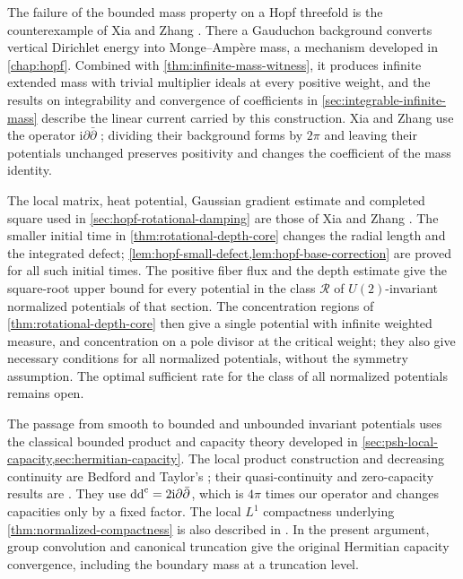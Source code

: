 The failure of the bounded mass property on a Hopf threefold is the counterexample of Xia and Zhang \cite[v1, Theorem~1.1, p.~2]{XZ26}. There a Gauduchon background converts vertical Dirichlet energy into Monge--Amp\`ere mass, a mechanism developed in \cref{chap:hopf}. Combined with \cref{thm:infinite-mass-witness}, it produces infinite extended mass with trivial multiplier ideals at every positive weight, and the results on integrability and convergence of coefficients in \cref{sec:integrable-infinite-mass} describe the linear current carried by this construction. Xia and Zhang use the operator $\mathrm i\partial\bar\partial$ \cite[v1, Section~1, p.~2]{XZ26}; dividing their background forms by $2\pi$ and leaving their potentials unchanged preserves positivity and changes the coefficient of the mass identity.

\label{hist:hopf-rotational-damping}
The local matrix, heat potential, Gaussian gradient estimate and completed square used in \cref{sec:hopf-rotational-damping} are those of Xia and Zhang \cite[v1, Lemma~2.2, pp.~4--5; Lemmas~3.1--3.3, pp.~6--9; equation~(4.2), p.~10]{XZ26}. The smaller initial time in \cref{thm:rotational-depth-core} changes the radial length and the integrated defect; \cref{lem:hopf-small-defect,lem:hopf-base-correction} are proved for all such initial times. The positive fiber flux and the depth estimate give the square-root upper bound for every potential in the class $\mathcal R$ of $U(2)$-invariant normalized potentials of that section. The concentration regions of \cref{thm:rotational-depth-core} then give a single potential with infinite weighted measure, and concentration on a pole divisor at the critical weight; they also give necessary conditions for all normalized potentials, without the symmetry assumption. The optimal sufficient rate for the class of all normalized potentials remains open.

The passage from smooth to bounded and unbounded invariant potentials uses the classical bounded product and capacity theory developed in \cref{sec:psh-local-capacity,sec:hermitian-capacity}. The local product construction and decreasing continuity are Bedford and Taylor's \cite[Theorem~2.1, pp.~4--7; Theorem~2.4, pp.~7--9; Corollary~2.8, p.~10]{BT82}; their quasi-continuity and zero-capacity results are \cite[Theorem~3.5, pp.~13--14; Theorems~6.9--6.10, pp.~25--26]{BT82}. They use $\mathrm{dd}^{\mathrm{c}}=2\mathrm i\partial\bar\partial$, which is $4\pi$ times our operator and changes capacities only by a fixed factor. The local $L^1$ compactness underlying \cref{thm:normalized-compactness} is also described in \cite[Chapter~I, Proposition~4.21, pp.~36--37; Proposition~5.9, p.~40]{DemCADG}. In the present argument, group convolution and canonical truncation give the original Hermitian capacity convergence, including the boundary mass at a truncation level.

